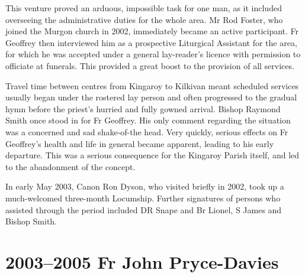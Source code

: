 This venture proved an arduous, impossible task for one man, as it included overseeing the administrative duties for the whole area. Mr Rod Foster, who joined the Murgon church in 2002, immediately became an active participant. Fr Geoffrey then interviewed him as a prospective Liturgical Assistant for the area, for which he was accepted under a general lay-reader's licence with permission to officiate at funerals. This provided a great boost to the provision of all services.



Travel time between centres from Kingaroy to Kilkivan meant scheduled services usually began under the rostered lay person and often progressed to the gradual hymn before the priest's hurried and fully gowned arrival. Bishop Raymond Smith once stood in for Fr Geoffrey. His only comment regarding the situation was a concerned and sad shake-of-the head. Very quickly, serious effects on Fr Geoffrey's health and life in general became apparent, leading to his early departure. This was a serious consequence for the Kingaroy Parish itself, and led to the abandonment of the concept.



In early May 2003, Canon Ron Dyson, who visited briefly in 2002, took up a much-welcomed three-month Locumship. Further signatures of persons who assisted through the period included DR Snape and Br Lionel, S James and Bishop Smith.



\section{2003--2005 Fr John Pryce-Davies}









